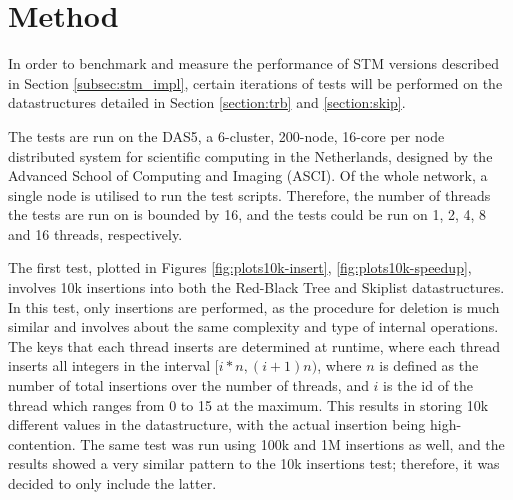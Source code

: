 \label{chapter:eval}
\section{Method}

In order to benchmark and measure the performance of STM versions described in Section \ref{subsec:stm_impl}, certain iterations of tests will be performed on the datastructures detailed in Section \ref{section:trb} and \ref{section:skip}. 

The tests are run on the DAS5\cite{das5}, a 6-cluster, 200-node, 16-core per node distributed system for scientific computing in the Netherlands, designed by the Advanced School of Computing and Imaging (ASCI). Of the whole network, a single node is utilised to run the test scripts. Therefore, the number of threads the tests are run on is bounded by 16, and the tests could be run on 1, 2, 4, 8 and 16 threads, respectively.

The first test, plotted in Figures \ref{fig:plots10k-insert}, \ref{fig:plots10k-speedup}, involves 10k insertions into both the Red-Black Tree and Skiplist datastructures. In this test, only insertions are performed, as the procedure for deletion is much similar and involves about the same complexity and type of internal operations. The keys that each thread inserts are determined at runtime, where each thread inserts all integers in the interval $[{i * n}, {(i + 1)n})$, where $n$ is defined as the number of total insertions over the number of threads, and $i$ is the id of the thread which ranges from 0 to 15 at the maximum. This results in storing 10k different values in the datastructure, with the actual insertion being high-contention. The same test was run using 100k and 1M insertions as well, and the results showed a very similar pattern to the 10k insertions test; therefore, it was decided to only include the latter.


